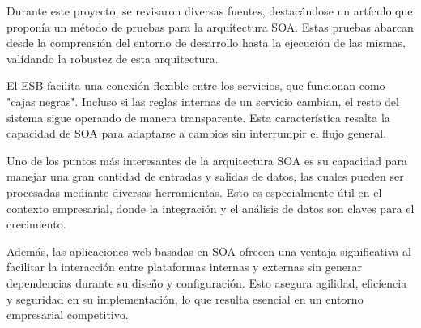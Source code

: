 \documentclass[10pt]{article}
\begin{document}
        Durante este proyecto, se revisaron diversas fuentes, destacándose un artículo que proponía un método de pruebas para la arquitectura SOA. Estas pruebas abarcan desde la comprensión del entorno de desarrollo hasta la ejecución de las mismas, validando la robustez de esta arquitectura.
        
        El ESB facilita una conexión flexible entre los servicios, que funcionan como "cajas negras". Incluso si las reglas internas de un servicio cambian, el resto del sistema sigue operando de manera transparente. Esta característica resalta la capacidad de SOA para adaptarse a cambios sin interrumpir el flujo general.
        
        Uno de los puntos más interesantes de la arquitectura SOA es su capacidad para manejar una gran cantidad de entradas y salidas de datos, las cuales pueden ser procesadas mediante diversas herramientas. Esto es especialmente útil en el contexto empresarial, donde la integración y el análisis de datos son claves para el crecimiento.
        
        Además, las aplicaciones web basadas en SOA ofrecen una ventaja significativa al facilitar la interacción entre plataformas internas y externas sin generar dependencias durante su diseño y configuración. Esto asegura agilidad, eficiencia y seguridad en su implementación, lo que resulta esencial en un entorno empresarial competitivo.

\vspace{0.5cm}
\nocite{*}
\printbibliography

    
\end{document}
